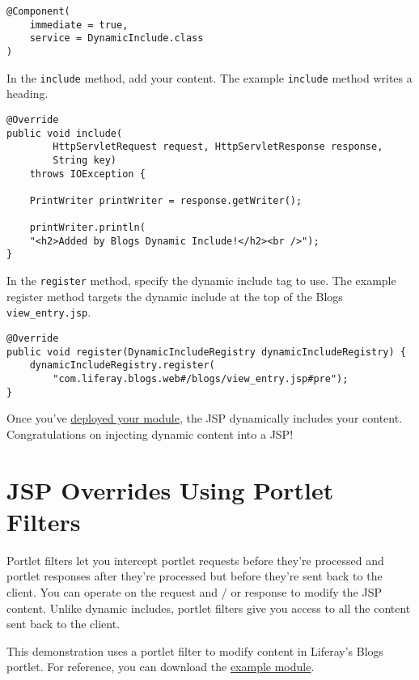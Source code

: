 \begin{enumerate}
\begin{verbatim}
@Component(
    immediate = true,
    service = DynamicInclude.class
)
\end{verbatim}

  In the \texttt{include} method, add your content. The example
  \texttt{include} method writes a heading.

\begin{verbatim}
@Override
public void include(
        HttpServletRequest request, HttpServletResponse response,
        String key)
    throws IOException {

    PrintWriter printWriter = response.getWriter();

    printWriter.println(
    "<h2>Added by Blogs Dynamic Include!</h2><br />");
}
\end{verbatim}

  In the \texttt{register} method, specify the dynamic include tag to
  use. The example register method targets the dynamic include at the
  top of the Blogs \texttt{view\_entry.jsp}.

\begin{verbatim}
@Override
public void register(DynamicIncludeRegistry dynamicIncludeRegistry) {
    dynamicIncludeRegistry.register(
        "com.liferay.blogs.web#/blogs/view_entry.jsp#pre");
}
\end{verbatim}
\end{enumerate}

Once you've
\href{/docs/7-2/reference/-/knowledge_base/r/deploying-a-project}{deployed
your module}, the JSP dynamically includes your content. Congratulations
on injecting dynamic content into a JSP!

\chapter{JSP Overrides Using Portlet
Filters}\label{jsp-overrides-using-portlet-filters}

Portlet filters let you intercept portlet requests before they're
processed and portlet responses after they're processed but before
they're sent back to the client. You can operate on the request and / or
response to modify the JSP content. Unlike dynamic includes, portlet
filters give you access to all the content sent back to the client.

This demonstration uses a portlet filter to modify content in Liferay's
Blogs portlet. For reference, you can download the
\href{https://portal.liferay.dev/documents/113763090/114000186/example-portlet-filter-customize-jsp-master.zip}{example
module}.

